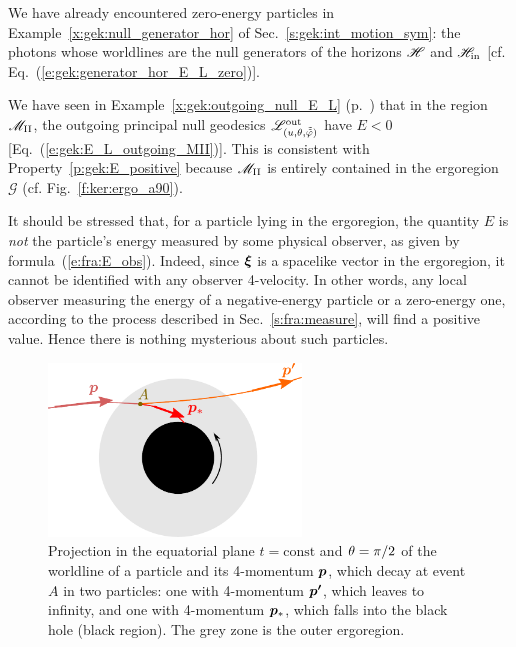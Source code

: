 \begin{example}
We have already encountered zero-energy particles in Example~\ref{x:gek:null_generator_hor} of Sec.~\ref{s:gek:int_motion_sym}: the photons whose worldlines are the null generators of the horizons $\mathscr{H}$
and $\mathscr{H}_{\rm in}$ [cf. Eq.~(\ref{e:gek:generator_hor_E_L_zero})].
\end{example}

\begin{example}
We have seen in Example~\ref{x:gek:outgoing_null_E_L} (p.~\pageref{x:gek:outgoing_null_E_L})
that in the region $\mathscr{M}_{\rm II}$, the outgoing principal null geodesics $\mathscr{L}^{\rm out}_{(u,\theta,\tilde{{\tilde\varphi}})}$ have $E<0$ [Eq.~(\ref{e:gek:E_L_outgoing_MII})]. This is consistent with
Property~\ref{p:gek:E_positive} because $\mathscr{M}_{\rm II}$ is entirely contained in the ergoregion $\mathscr{G}$
(cf. Fig.~\ref{f:ker:ergo_a90}).
\end{example}

\begin{remark}
It should be stressed that, for a particle lying in the ergoregion,
the quantity $E$ is \emph{not} the particle's energy measured by some
physical observer, as given by formula~(\ref{e:fra:E_obs}).
Indeed, since $\bm{\xi}$ is a spacelike vector in the ergoregion,
it cannot be identified with any observer
4-velocity.
In other words, any local
observer measuring the energy of a negative-energy particle or a zero-energy one, according to the process described in Sec.~\ref{s:fra:measure}, will
find a positive value. Hence there is nothing mysterious about such particles.
\end{remark}

\begin{figure}
\centerline{\includegraphics[width=0.6\textwidth]{gek_penrose_proc.pdf}}
\caption[]{\label{f:gek:penrose_proc} \footnotesize
Projection in the equatorial plane $t=\mathrm{const}$
and $\theta=\pi/2$ of the worldline of a particle and its 4-momentum $\bm{p}$,
which decay at event $A$ in two particles: one with 4-momentum
$\bm{p'}$, which leaves to infinity, and one with 4-momentum
$\bm{p}_*$, which falls into the black hole (black region).
The grey zone is the outer ergoregion.
}
\end{figure}

